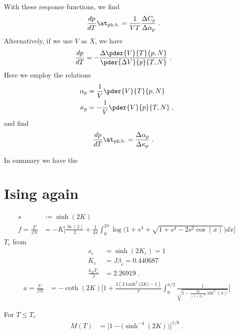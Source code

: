 %
With these response functions, we find
%
\begin{align}\label{eq:}
\frac{dp}{dT}\at_\text{ph.b.} &= \frac{1}{V T}\frac{\Delta C_{p}}{\Delta \alpha_{p}}\;.
\end{align}
%
Alternatively, if we use $V$ as $X$, we have
%
\begin{align}\label{eq:}
\frac{d p}{dT} &=-\frac{\Delta \pder{V}{T}{p,N}}
{\pder{\Delta V}{p}{T,N}}\;.
\end{align}
%
Here we employ the relations
%
\begin{align*}
\alpha_{p} &= \frac{1}{V} \pder{V}{T}{p,N}\\
\kappa_{p} &= -\frac{1}{V} \pder{V}{p}{T,N} \;,
\end{align*}
%
and find
\begin{align}\label{eq:}
\frac{dp}{dT}\at_\text{ph.b.} &= \frac{\Delta \alpha_{p}}{\Delta \kappa_{p}}\;.
\end{align}

In summary we have the


\section{Ising again}

%
\begin{align*}
s&:=\sinh(2K)\\
f=\frac{F}{JN} &= -K\bigg[\frac{\ln(2)}{2} +\frac{1}{4\pi}\int_{0}^{2\pi}
\log\bigg( 1+ s^{4} + \sqrt{1+s^{4} -2 s^{2}\cos(x)}\bigg) dx\bigg]
\end{align*}
%
$T_{c}$ from
%
\begin{align*}
s_{c} &= \sinh(2K_{c}) = 1\\
K_{c} &= J \beta_{c} = 0.440687\\
\frac{k_{B} T_{c}}{J} &=2.26919\;.
\end{align*}
%
%
\begin{align*}
u=\frac{U}{JN} &= -   \coth(2 K)
\bigg[ 
1+\frac{2( 2 \tanh^{2}\big( 2K \big)-1 )}{\pi}
\int_{0}^{\pi/2}\frac{1}
{
\sqrt{1-\frac{4k}{(1+k)^{2}}\sin^{2}(x)}
}
 \bigg]
\end{align*}
%


For $T\le T_{c}$
%
\begin{align*}
M(T) &= \bigg[ 1 - \bigg(\sinh^{-4}(2K)  \bigg) \bigg]^{1/8}\;.
\end{align*}
%

